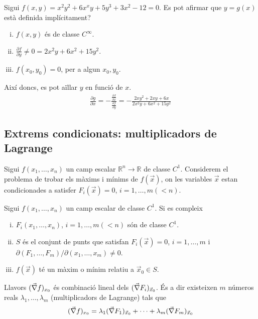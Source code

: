 \begin{example}
    Sigui $f(x,y) = x^{2}y^{2}+6x^{x}y + 5y^{3} + 3x^{2} - 12 = 0$. Es pot afirmar que $y = g(x)$ està definida implícitament?
    \begin{enumerate}[i)]
        \item $f(x,y)$ és de classe $C^{\infty}$.
        \item $\displaystyle \frac{\partial f}{\partial y} \neq 0 = 2x^{2}y + 6x^{2} + 15 y^{2}$. 
        \item $f(x_{0}, y_{0}) = 0$, per a algun $x_{0}, y_{0}$.
    \end{enumerate}
    Així doncs, es pot aïllar $y$ en funció de $x$.
    \begin{align*}
        \frac{\partial g}{\partial x} = - \frac{\displaystyle \frac{\partial f}{\partial x}}{\displaystyle \frac{\partial f}{\partial y}} = - \frac{2xy^{2} + 2xy + 6x}{2x^{2}y + 6x^{2} + 15 y^{2}}
    \end{align*}
\end{example}

\subsection{Extrems condicionats: multiplicadors de Lagrange}
Sigui $f(x_{1}, \dots , x_{n})$ un camp escalar $\mathbb{R}^{n} \to \mathbb{R}$ de classe $C^{1}$. Considerem el problema de trobar els màxims i mínims de $f(\vec{x})$, on les variables $\vec{x}$ estan condicionades a satisfer $F_{i} (\vec{x}) = 0$, $i = 1, \dots, m(<n)$.
\begin{thm}
    Sigui $f(x_{1}, \dots , x_{n})$ un camp escalar de classe $C^{1}$. Si es compleix
    \begin{enumerate}[i)]
        \item $F_{i}(x_{1}, \dots, x_{n})$, $i = 1, \dots, m(<n)$ són de classe $C^{1}$.
        \item $S$ és el conjunt de punts que satisfan $F_{i}(\vec{x}) = 0$, $i = 1, \dots , m$ i $\partial (F_{1}, \dots, F_{m}) / \partial (x_{1}, \dots, x_{m}) \neq 0$.
        \item $f(\vec{x})$ té un màxim o mínim relatiu a $\vec{x}_{0} \in S$.
    \end{enumerate}
    Llavors $(\vec{\nabla} f)_{x_{0}}$ és combinació lineal dels $(\vec{\nabla} F_{i})_{\vec{x}_{0}}$. És a dir existeixen $m$ números reals $\lambda_{1}, \dots, \lambda_{m}$ (multiplicadors de Lagrange) tals que 
    \begin{align}
        (\vec{\nabla} f)_{x_{0}} = \lambda_{1} (\vec{\nabla} F_{1})_{\vec{x}_{0}} + \dots + \lambda_{m} (\vec{\nabla} F_{m})_{\vec{x}_{0}}
    \end{align}
\end{thm}

